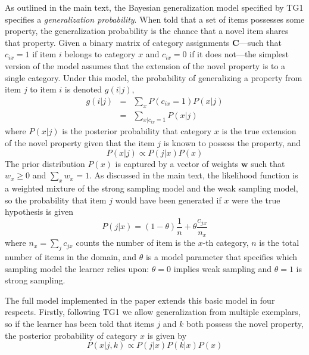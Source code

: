 As outlined in the main text, the Bayesian generalization model specified by TG1 specifies a {\it generalization probability}. When told that a set of items possesses some property, the generalization probability is the chance that a novel item shares that property. Given a binary matrix of category assignments $\mathbf{C}$---such that $c_{ix} = 1$ if item $i$ belongs to category $x$ and $c_{ix}=0$ if it does not---the simplest version of the model assumes that the extension of the novel property is to a single category. Under this model, the probability of generalizing a property from item $j$ to item $i$ is denoted $g(i|j)$, 
\begin{equation}
\begin{array}{rcl}
g(i|j) &=& \sum_x P(c_{ix}=1) P(x | j)  \\
&=& \sum_{x | c_{ix}=1} P(x | j)
\end{array}
\end{equation}
where $P(x|j)$ is the posterior probability that category $x$ is the true extension of the novel property given that the item $j$ is known to possess the property, and 
\begin{equation}
P(x|j) \propto P(j|x) P(x)
\end{equation}
The prior distribution $P(x)$ is captured by a vector of weights $\mathbf{w}$ such that $w_x \geq 0$ and $\sum_x w_x = 1$. As discussed in the main text, the likelihood function is a weighted mixture of the strong sampling model and the weak sampling model, so the probability that item $j$ would have been generated if $x$ were the true hypothesis is given 
\begin{equation}
P(j|x) = (1-\theta) \frac{1}{n} + \theta \frac{c_{jx}}{n_x}
\end{equation}
where $n_x = \sum_j c_{jx}$ counts the number of item is the $x$-th category, $n$ is the total number of items in the domain, and $\theta$ is a model parameter that specifies which sampling model the learner relies upon: $\theta=0$ implies weak sampling and $\theta=1$ is strong sampling.

The full model implemented in the paper extends this basic model in four respects. Firstly, following TG1 we allow generalization from multiple exemplars, so if the learner has been told that items $j$ and $k$ both possess the novel property, the posterior probability of category $x$ is given by
\begin{equation}
P(x|j,k) \propto P(j|x) P(k|x) P(x)
\end{equation}

